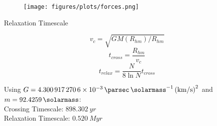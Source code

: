 \begin{frame}

	\begin{figure}
		\centering
		\texttt{[image: figures/plots/forces.png]}
	\end{figure}

\end{frame}

\begin{frame}{Relaxation Timescale}


	\begin{equation}
		v_c = \sqrt{GM(R_{hm})/R_{hm}}
		\label{eq:circular-velocity}
	\end{equation}
	\begin{equation}
		t_{cross} = \frac{R_{hm}}{v_c}
		\label{eq:crossing_timescale}
	\end{equation}
	\begin{equation}
		t_{relax} = \frac{N}{8\ln{N}}t_{cross}
		\label{eq:relaxation_timescale}
	\end{equation}

	\bigskip

	Using $G = \SI{4.3009172706e-3}{\parsec.\solarmass^{-1}.(\kilo\metre\per\second)^2}$ and $m = \SI{92.4259}{\solarmass}$: \\

	Crossing Timescale: $898.302\ yr$ \\
	Relaxation Timescale: $0.520\ Myr$

\end{frame}

